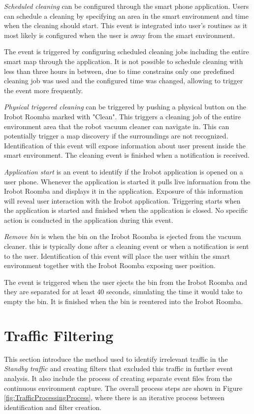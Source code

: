 \textit{Scheduled cleaning} can be configured through the smart phone application. Users can schedule a cleaning by specifying an area in the smart environment and time when the cleaning should start. This event is integrated into user's routines as it most likely is configured when the user is away from the smart environment.

The event is triggered by configuring scheduled cleaning jobs including the entire smart map through the application. It is not possible to schedule cleaning with less than three hours in between, due to time constrains only one predefined cleaning job was used and the configured time was changed, allowing to trigger the event more frequently.

\textit{Physical triggered cleaning} can be triggered by pushing a physical button on the Irobot Roomba marked with "Clean". This triggers a cleaning job of the entire environment area that the robot vacuum cleaner can navigate in. This can potentially trigger a map discovery if the surroundings are not recognized. Identification of this event will expose information about user present inside the smart environment. The cleaning event is finished when a notification is received. 

\textit{Application start} is an event to identify if the Irobot application is opened on a user phone. Whenever the application is started it pulls live information from the Irobot Roomba and displays it in the application. Exposure of this information will reveal user interaction with the Irobot application. Triggering starts when the application is started and finished when the application is closed. No specific action is conducted in the application during this event. 

\textit{Remove bin} is when the bin on the Irobot Roomba is ejected from the vacuum cleaner. this is typically done after a cleaning event or when a notification is sent to the user. Identification of this event will place the user within the smart environment together with the Irobot Roomba exposing user position. 

The event is triggered when the user ejects the bin from the Irobot Roomba and they are separated for at least 40 seconds, simulating the time it would take to empty the bin. It is finished when the bin is reentered into the Irobot Roomba. 

\section{Traffic Filtering}
This section introduce the method used to identify irrelevant traffic in the \textit{Standby traffic} and creating filters that excluded this traffic in further event analysis. It also include the process of creating separate event files from the continuous environment capture. The overall process steps are shown in Figure \ref{fig:TrafficProcessingProcess}, where there is an iterative process between identification and filter creation.

